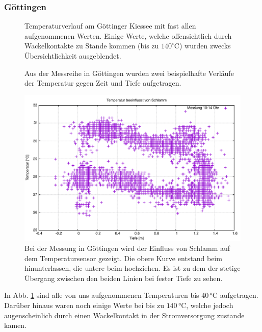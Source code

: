 \documentclass[12pt,a4paper,titlepage,headinclude,bibtotoc]{scrartcl}
\numberwithin{equation}{subsection}
\begin{document}
\subsubsection{Göttingen}
\begin{figure}[h]
\centering

\caption{Temperaturverlauf am Göttinger Kiessee mit fast allen aufgenommenen Werten. Einige Werte, welche offensichtlich durch Wackelkontakte zu Stande kommen (bis zu $140^\circ$C) wurden zwecks Übersichtlichkeit ausgeblendet.}
\label{fig:temp_goe}
\end{figure}
\begin{figure}[!h]
	\centering
   \hfill
	\caption{Aus der Messreihe in Göttingen wurden zwei beispielhafte Verläufe der Temperatur gegen Zeit und Tiefe aufgetragen.}
	\label{fig:tempGoeBsp}
\end{figure}
\begin{figure}[!h]
	\centering
	\includegraphics[width=0.8\linewidth]{TempSchlamm}
	\caption{Bei der Messung in Göttingen wird der Einfluss von Schlamm auf dem Temperatursensor gezeigt. Die obere Kurve entstand beim hinunterlassen, die untere beim hochziehen. Es ist zu dem der stetige Übergang zwischen den beiden Linien bei fester Tiefe zu sehen.}
	\label{fig:tempSchlamm}
\end{figure}
In Abb. \ref{fig:temp_goe} sind alle von uns aufgenommenen Temperaturen bis $40\,\si{\celsius}$ aufgetragen.
Darüber hinaus waren noch einige Werte bei bis zu $140\,\si{\celsius}$, welche jedoch augenscheinlich durch einen Wackelkontakt in der Stromversorgung zustande kamen.
\end{document}

